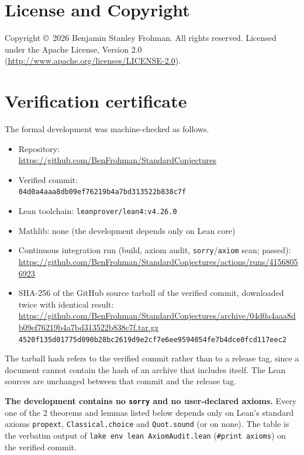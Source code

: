 \documentclass[11pt]{article}
\begin{document}
\section*{License and Copyright}
Copyright \copyright\ 2026 Benjamin Stanley Frohman. All rights reserved. Licensed under the Apache License, Version 2.0 (\url{http://www.apache.org/licenses/LICENSE-2.0}).
\appendix
\section{Verification certificate}\label{app:verification-certificate}

The formal development was machine-checked as follows.

{\raggedright
\begin{itemize}
\item Repository:\\ {\footnotesize\url{https://github.com/BenFrohman/StandardConjectures}}
\item Verified commit:\\ {\footnotesize\texttt{04d0a4aaa8db09ef76219b4a7bd313522b838c7f}}
\item Lean toolchain: \texttt{leanprover/lean4:v4.26.0}
\item Mathlib: none (the development depends only on Lean core)
\item Continuous integration run (build, axiom audit, \texttt{sorry}/\texttt{axiom} scan; passed):\\ {\footnotesize\url{https://github.com/BenFrohman/StandardConjectures/actions/runs/41568056923}}
\item SHA-256 of the GitHub source tarball of the verified commit, downloaded twice with identical result:\\ {\footnotesize\url{https://github.com/BenFrohman/StandardConjectures/archive/04d0a4aaa8db09ef76219b4a7bd313522b838c7f.tar.gz}}\\
{\footnotesize\texttt{4520f135d01775d090b28bc2619d9e2cf7e6ee9594054fe7b4dce0fcd117eec2}}
\end{itemize}\par}

The tarball hash refers to the verified commit rather than to a release tag, since a document cannot contain the hash of an archive that includes itself. The Lean sources are unchanged between that commit and the release tag.

\textbf{The development contains no \texttt{sorry} and no user-declared axioms.} Every one of the 2 theorems and lemmas listed below depends only on Lean's standard axioms \texttt{propext}, \texttt{Classical.choice} and \texttt{Quot.sound} (or on none). The table is the verbatim output of \texttt{lake env lean AxiomAudit.lean} (\texttt{\#print axioms}) on the verified commit.
\end{document}
